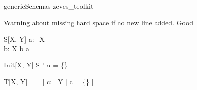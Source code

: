
\begin{zsection}
   \SECTION genericSchemas \parents zeves\_toolkit
\end{zsection}

Warning about missing hard space if no new line added. Good
\begin{schema}{S}[X, Y]
   a: \power~X \\
   b: X
\where
   b \in a
\end{schema}

\begin{schema}{Init}[X, Y]
   S~'
\where
   a = \{\}
\end{schema}

\begin{zed}
   T[X, Y] == [ c: \power~Y | \lnot c = \{\} ]
\end{zed}